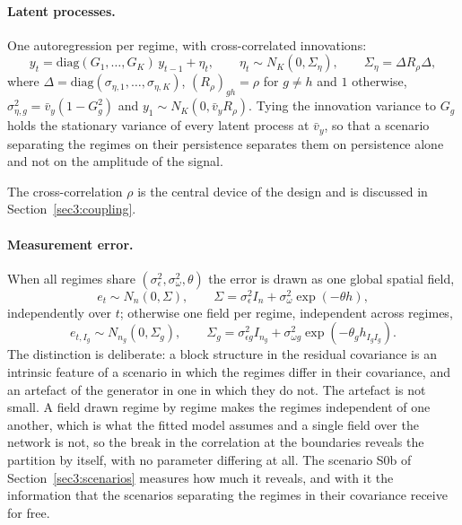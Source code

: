 \paragraph{Latent processes.} One autoregression per regime, with cross-correlated innovations:
\begin{equation}
  y_t = \mathrm{diag}(G_1,\dots,G_K)\,y_{t-1} + \eta_t,
  \qquad \eta_t \sim N_K(0, \Sigma_\eta),
  \qquad \Sigma_\eta = \Delta R_\rho \Delta,
  \label{eq:dgplatent}
\end{equation}
where $\Delta = \mathrm{diag}(\sigma_{\eta,1},\dots,\sigma_{\eta,K})$, $(R_\rho)_{gh} = \rho$ for $g \neq h$ and $1$ otherwise, $\sigma^2_{\eta,g} = \bar v_y (1-G_g^2)$ and $y_1 \sim N_K(0, \bar v_y R_\rho)$. Tying the innovation variance to $G_g$ holds the stationary variance of every latent process at $\bar v_y$, so that a scenario separating the regimes on their persistence separates them on persistence alone and not on the amplitude of the signal.

The cross-correlation $\rho$ is the central device of the design and is discussed in Section~\ref{sec3:coupling}.

\paragraph{Measurement error.} When all regimes share $(\sigma^2_\epsilon, \sigma^2_\omega, \theta)$ the error is drawn as one global spatial field,
\begin{equation}
  e_t \sim N_n(0, \Sigma), \qquad
  \Sigma = \sigma^2_\epsilon I_n + \sigma^2_\omega \exp(-\theta h),
  \label{eq:dgperr}
\end{equation}
independently over $t$; otherwise one field per regime, independent across regimes,
\begin{equation}
  e_{t,I_g} \sim N_{n_g}(0, \Sigma_g), \qquad
  \Sigma_g = \sigma^2_{\epsilon g} I_{n_g}
           + \sigma^2_{\omega g} \exp(-\theta_g h_{I_g I_g}).
  \label{eq:dgperrg}
\end{equation}
The distinction is deliberate: a block structure in the residual covariance is an intrinsic feature of a scenario in which the regimes differ in their covariance, and an artefact of the generator in one in which they do not. The artefact is not small. A field drawn regime by regime makes the regimes independent of one another, which is what the fitted model assumes and a single field over the network is not, so the break in the correlation at the boundaries reveals the partition by itself, with no parameter differing at all. The scenario S0b of Section~\ref{sec3:scenarios} measures how much it reveals, and with it the information that the scenarios separating the regimes in their covariance receive for free.

